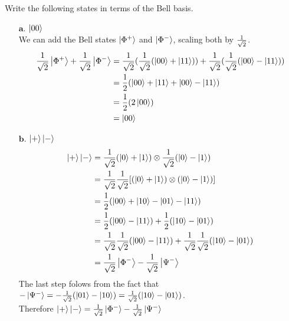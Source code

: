 \documentclass[11pt]{article}
\def\haf{\frac{1}{2}}
\def\srtt{\ensuremath\frac{1}{\sqrt{2}}}
\begin{document}
Write the following states in terms of the Bell basis.

\begin{itemize}
    \item[$\textbf{a.}$] $\ket{00}$  \\
        We can add the Bell states $\ket{\Phi^+}$ and $\ket{\Phi^-}$, scaling both by $\srtt$.
        \begin{align*}
         \srtt\ket{\Phi^+} + \srtt\ket{\Phi^-} 
            &= \srtt(\srtt(\ket{00} + \ket{11})) + \srtt(\srtt(\ket{00} - \ket{11})) \\
            &= \haf(\ket{00} + \ket{11} + \ket{00} - \ket{11}) \\
            &= \haf(2\ket{00}) \\
            &= \ket{00}
        \end{align*} 

    \item[$\textbf{b.}$] $\ket{+}\ket{-}$
        \begin{align*}
            \ket{+}\ket{-} 
            &= \srtt(\ket{0} + \ket{1}) \otimes \srtt(\ket{0} - \ket{1}) \\
            &= \srtt\srtt[(\ket{0} + \ket{1}) \otimes (\ket{0} - \ket{1})] \\
            &= \frac{1}{2}(\ket{00} + \ket{10} - \ket{01} - \ket{11}) \\
            &= \haf(\ket{00} - \ket{11}) + \haf(\ket{10} - \ket{01}) \\
            &= \srtt\srtt(\ket{00} - \ket{11}) + \srtt\srtt(\ket{10} - \ket{01}) \\
            &= \srtt\ket{\Phi^{-}} - \srtt\ket{\Psi^{-}}
        \end{align*}
        The last step folows from the fact that $-\ket{\Psi^{-}} = -\srtt(\ket{01} - \ket{10}) = \srtt(\ket{10} - \ket{01})$. \\
        Therefore $\ket{+}\ket{-} = \srtt\ket{\Phi^{-}} - \srtt\ket{\Psi^{-}}$

\newpage


\end{itemize}
\end{document}
